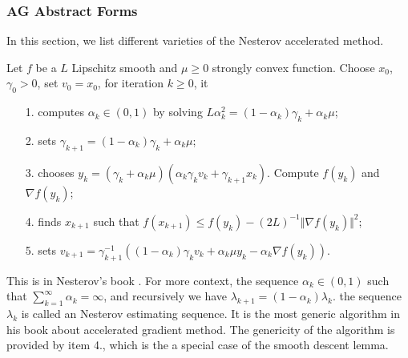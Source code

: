 \documentclass[12pt]{article}
\begin{document}
        \subsubsection{AG Abstract Forms}
            In this section, we list different varieties of the Nesterov accelerated method. 
            \begin{definition}[Nestrov 2.2.7]\label{def:Nes2.2.7}
                Let $f$ be a $L$ Lipschitz smooth and $\mu\ge 0$ strongly convex function. 
                Choose $x_0$, $\gamma_0 > 0$, set $v_0 = x_0$, for iteration $k\ge 0$, it
                \begin{enumerate}
                    \item[1.] computes $\alpha_k \in (0, 1)$ by solving $L\alpha_k^2 = (1 - \alpha_k)\gamma_k + \alpha_k \mu$; 
                    \item[2.] sets $\gamma_{k + 1} = (1 - \alpha_k)\gamma_k + \alpha_k \mu$;
                    \item[3.] chooses $y_k = (\gamma_k + \alpha_k \mu)(\alpha_k \gamma_k v_k + \gamma_{k + 1}x_k)$. Compute $f(y_k)$ and $\nabla f(y_k)$; 
                    \item[4.] finds $x_{k + 1}$ such that $f(x_{k + 1}) \le f(y_k) - (2L)^{-1} \Vert \nabla f(y_k)\Vert^2$; 
                    \item[5.] sets $v_{k + 1} = \gamma_{k+1}^{-1}((1 - \alpha_k)\gamma_kv_k + \alpha_k \mu y_k - \alpha_k \nabla f(y_k))$. 
                \end{enumerate}
            \end{definition}
            \begin{remark}
                This is in Nesterov's book \cite[(2.2.7)]{nesterov_lectures_2018}. 
                For more context, the sequence $\alpha_k \in (0, 1)$ such that $\sum_{k = 1}^{\infty}\alpha_k = \infty$, and recursively we have $\lambda_{k + 1} = (1 - \alpha_k)\lambda_k$. 
                the sequence $\lambda_k$ is called an Nesterov estimating sequence. 
                It is the most generic algorithm in his book about accelerated gradient method. 
                The genericity of the algorithm is provided by item 4., which is the a special case of the smooth descent lemma. 

            \end{remark}
\end{document}
